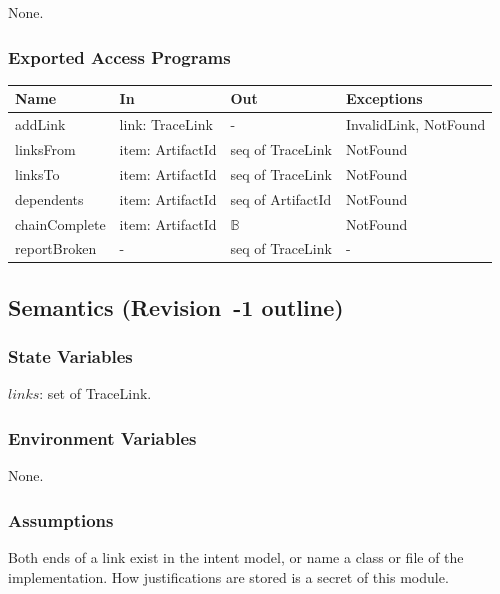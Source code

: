 \documentclass[12pt, titlepage]{article}
\begin{document}
None.

\subsubsection{Exported Access Programs}

\begin{center}
\small
\begin{tabular}{>{\raggedright\arraybackslash}p{3.7cm} >{\raggedright\arraybackslash}p{3.8cm} >{\raggedright\arraybackslash}p{3.6cm} >{\raggedright\arraybackslash}p{3.7cm}}
\hline
\textbf{Name} & \textbf{In} & \textbf{Out} & \textbf{Exceptions} \\
\hline
addLink & link: TraceLink & - & InvalidLink, NotFound \\
linksFrom & item: ArtifactId & seq of TraceLink & NotFound \\
linksTo & item: ArtifactId & seq of TraceLink & NotFound \\
dependents & item: ArtifactId & seq of ArtifactId & NotFound \\
chainComplete & item: ArtifactId & $\mathbb{B}$ & NotFound \\
reportBroken & - & seq of TraceLink & - \\
\hline
\end{tabular}
\end{center}

\subsection{Semantics (Revision~-1 outline)}

\subsubsection{State Variables}

$links$: set of TraceLink.

\subsubsection{Environment Variables}

None.

\subsubsection{Assumptions}

Both ends of a link exist in the intent model, or name a class or file of the
implementation. How justifications are stored is a secret of this module.
\end{document}
